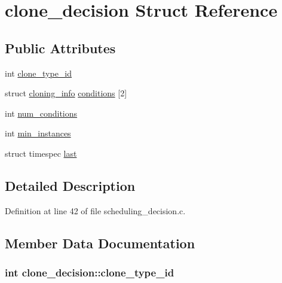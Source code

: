 \hypertarget{structclone__decision}{\section{clone\-\_\-decision Struct Reference}
\label{structclone__decision}
}
\subsection*{Public Attributes}
\begin{DoxyCompactItemize}
\item 
int \hyperlink{structclone__decision_a146faefdfa12d1b225ac34042c14d040}{clone\-\_\-type\-\_\-id}
\item 
struct \hyperlink{structcloning__info}{cloning\-\_\-info} \hyperlink{structclone__decision_ae84268034a0e7757434e248585ab3dbe}{conditions} \mbox{[}2\mbox{]}
\item 
int \hyperlink{structclone__decision_acff7bab31412f4ef8029ab063cc4a72b}{num\-\_\-conditions}
\item 
int \hyperlink{structclone__decision_ad16c65d3fc8367b519b479127b47d281}{min\-\_\-instances}
\item 
struct timespec \hyperlink{structclone__decision_a05c1d1a8a5d670647dfde1e854ffb82b}{last}
\end{DoxyCompactItemize}


\subsection{Detailed Description}


Definition at line 42 of file scheduling\-\_\-decision.\-c.



\subsection{Member Data Documentation}
\hypertarget{structclone__decision_a146faefdfa12d1b225ac34042c14d040}{
\subsubsection[{clone\-\_\-type\-\_\-id}]{\setlength{\rightskip}{0pt plus 5cm}int clone\-\_\-decision\-::clone\-\_\-type\-\_\-id}}\label{structclone__decision_a146faefdfa12d1b225ac34042c14d040}


